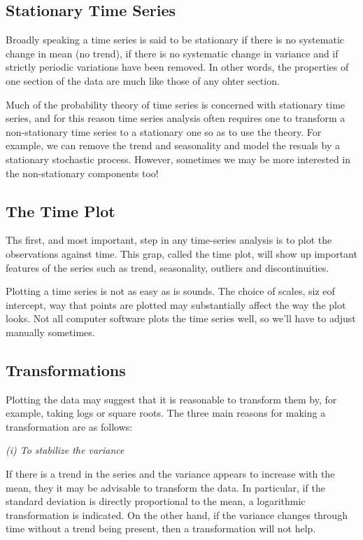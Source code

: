 \subsection{Stationary Time Series}
Broadly speaking a time series is said to be stationary if there is no systematic change in mean (no trend), if there is no systematic change in variance and if strictly periodic variations have been removed. In other words, the properties of one section of the data are much like those of any ohter section.

Much of the probability theory of time series is concerned with stationary time series, and for this reason time series analysis often requires one to transform a non-stationary time series to a stationary one so as to use the theory. For example, we can remove the trend and seasonality and model the resuals by a stationary stochastic process. However, sometimes we may be more interested in the non-stationary components too!



\subsection{The Time Plot}
Ths first, and most important, step in any time-series analysis is to plot the observations against time. This grap, called the time plot, will show up important features of the series such as trend, seasonality, outliers and discontinuities. 

Plotting a time series is not as easy as is sounds. The choice of scales, siz eof intercept, way that points are plotted may substantially affect the way the plot looks. Not all computer software plots the time series well, so we'll have to adjust manually sometimes.



\subsection{Transformations}
Plotting the data may suggest that it is reasonable to transform them by, for example, taking logs or square roots. The three main reasons for making a transformation are as follows:

\textit{(i) To stabilize the variance}

If there is a trend in the series and the variance appears to increase with the mean, they it may be advisable to transform the data. In particular, if the standard deviation is directly proportional to the mean, a logarithmic transformation is indicated. On the other hand, if the variance changes through time without a trend being present, then a transformation will not help.

